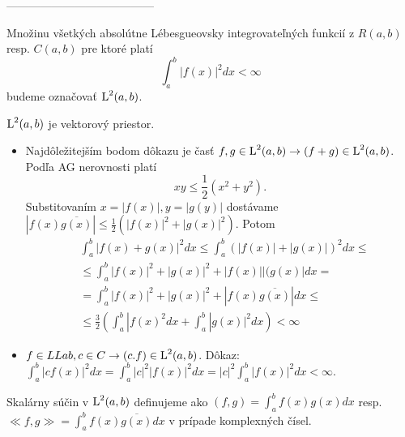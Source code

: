 ---------------------------------------

\begin{definicia}

Množinu všetkých absolútne Lébesgueovsky integrovateľných funkcií z $R(a,b)$
resp. $C(a,b)$
pre ktoré platí
\begin{equation}
\int_a^b |f(x)|^2 dx < \infty
\end{equation}
budeme označovať $\mbox{L}^2(a,b)$.

\end{definicia}

\begin{lema}
$\mbox{L}^2(a,b)$ je vektorový priestor.
\end{lema}

\begin{dokaz}
\begin{itemize}
\item
Najdôležitejším bodom dôkazu je časť $f,g \in \mbox{L}^2(a,b) \rightarrow (f+g)\in \mbox{L}^2(a,b)$.
Podľa AG nerovnosti platí 
\begin{equation*}
    xy \le \frac{1}{2}(x^2 + y^2).
\end{equation*}
Substitovaním $x=|f(x)|,y=|g(y)|$ dostávame
$|f(x)\overline{g(x)}| \le \frac{1}{2} 
( |f(x)|^2 + |g(x)|^2) $.
 Potom
 \begin{eqnarray*}
    & \int_a^b |f(x)+g(x)|^2 dx  \le
    \int_a^b (|f(x)|+|g(x)|)^2 dx \le \\    
    & \le  \int_a^b |f(x)|^2 + |g(x)|^2 + |f(x)||(g(x)| dx = \\
    & = \int_a^b |f(x)|^2 + |g(x)|^2 + |f(x) \overline{g(x)}| dx \le \\
    & \le \frac{3}{2}( \int_a^b |f(x)^2 dx + \int_a^b |g(x)|^2 dx)
    < \infty
 \end{eqnarray*} 
\item
$f \in LLab, c\in C \rightarrow (c.f) \in \mbox{L}^2(a,b)$.
Dôkaz: $\int_a^b |cf(x)|^2 dx = \int_a^b |c|^2 |f(x)|^2 dx =
 |c|^2 \int_a^b |f(x)|^2 dx < \infty$.
\end{itemize}
\end{dokaz}

\begin{definicia}
 Skalárny súčin v $\mbox{L}^2(a,b)$ definujeme ako
  $(f,g) = \int_a^b f(x) g(x) dx$ resp. 
  $\ll f,g \gg = \int_a^b f(x) \overline{g(x)} dx$ v prípade
  komplexných čísel.
\end{definicia}

